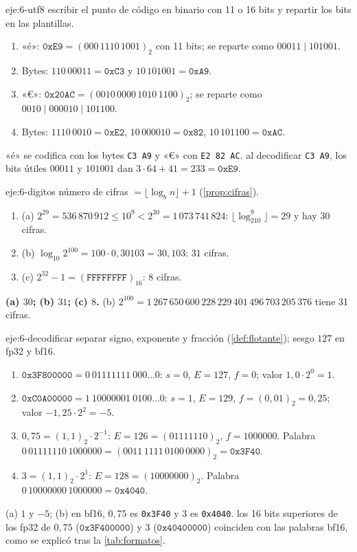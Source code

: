 \begin{solucion}{eje:6-utf8}
\planteamiento escribir el punto de código en binario con 11 o 16 bits y repartir los bits en las plantillas.
\pasos
\begin{enumerate}[label=\arabic*.]
  \item «é»: $\texttt{0xE9}=(000\,1110\,1001)_2$ con 11 bits; se reparte como $00011\mid101001$.
  \item Bytes: $110\,00011=\texttt{0xC3}$ y $10\,101001=\texttt{0xA9}$.
  \item «€»: $\texttt{0x20AC}=(0010\,0000\,1010\,1100)_2$; se reparte como $0010\mid000010\mid101100$.
  \item Bytes: $1110\,0010=\texttt{0xE2}$, $10\,000010=\texttt{0x82}$, $10\,101100=\texttt{0xAC}$.
\end{enumerate}
\resultado «é» se codifica con los bytes \texttt{C3 A9} y «€» con \texttt{E2 82 AC}.
\comprobacion al decodificar \texttt{C3 A9}, los bits útiles $00011$ y $101001$ dan $3\cdot64+41=233=\texttt{0xE9}$.
\end{solucion}

\begin{solucion}{eje:6-digitos}
\planteamiento número de cifras $=\lfloor\log_bn\rfloor+1$ (\cref{prop:cifras}).
\pasos
\begin{enumerate}[label=\arabic*.]
  \item (a) $2^{29}=536\,870\,912\le10^9<2^{30}=1\,073\,741\,824$: $\lfloor\log_210^9\rfloor=29$ y hay $30$ cifras.
  \item (b) $\log_{10}2^{100}=100\cdot0{,}30103=30{,}103$: $31$ cifras.
  \item (c) $2^{32}-1=(\texttt{FFFFFFFF})_{16}$: $8$ cifras.
\end{enumerate}
\resultado \textbf{(a) $30$; (b) $31$; (c) $8$.}
\comprobacion (b) $2^{100}=1\,267\,650\,600\,228\,229\,401\,496\,703\,205\,376$ tiene 31 cifras.
\end{solucion}

\begin{solucion}{eje:6-decodificar}
\planteamiento separar signo, exponente y fracción (\cref{def:flotante}); sesgo $127$ en fp32 y bf16.
\pasos
\begin{enumerate}[label=\arabic*.]
  \item $\texttt{0x3F800000}=0\ 01111111\ 000\dots0$: $s=0$, $E=127$, $f=0$; valor $1{,}0\cdot2^0=1$.
  \item $\texttt{0xC0A00000}=1\ 10000001\ 0100\dots0$: $s=1$, $E=129$, $f=(0{,}01)_2=0{,}25$; valor $-1{,}25\cdot2^{2}=-5$.
  \item $0{,}75=(1{,}1)_2\cdot2^{-1}$: $E=126=(01111110)_2$, $f=1000000$. Palabra $0\,01111110\,1000000=(0011\,1111\,0100\,0000)_2=\texttt{0x3F40}$.
  \item $3=(1{,}1)_2\cdot2^{1}$: $E=128=(10000000)_2$. Palabra $0\,10000000\,1000000=\texttt{0x4040}$.
\end{enumerate}
\resultado (a) $1$ y $-5$; (b) en bf16, $0{,}75$ es \texttt{0x3F40} y $3$ es \texttt{0x4040}.
\comprobacion los 16 bits superiores de los fp32 de $0{,}75$ ($\texttt{0x3F400000}$) y $3$ ($\texttt{0x40400000}$) coinciden con las palabras bf16, como se explicó tras la \cref{tab:formatos}.
\end{solucion}

